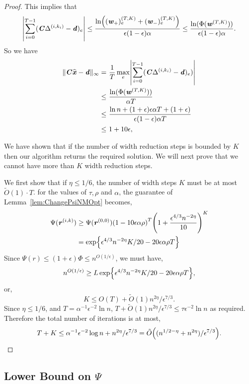 \documentclass[11pt]{article}
\def\abs#1{\left| #1 \right|}
\let\originalleft\left
\let\originalright\right
\renewcommand{\left}{\mathopen{}\mathclose\bgroup\originalleft}
\renewcommand{\right}{\aftergroup\egroup\originalright}
\newcommand\dd{\boldsymbol{\mathit{d}}}
\newcommand\rr{\boldsymbol{\mathit{r}}}
\newcommand\ww{\boldsymbol{\mathit{w}}}
\newcommand\xx{\boldsymbol{\mathit{x}}}
\newcommand\CC{\boldsymbol{\mathit{C}}}
\newcommand\xxhat{\widehat{\xx}}
\newcommand\Otil{\widetilde{O}}
\begin{document}
\begin{proof}
This implies that
\begin{align*}
\abs{\sum_{i=0}^{T-1} (\CC \Delta^{(i,k_i)} - \dd)_e} \leq \frac{\ln\left((\ww_+)^{(T,K)}_e +(\ww_{-})_e^{(T,K)}\right)}{\epsilon(1-\epsilon)\alpha} \leq \frac{\ln(\Phi(\ww^{(T,K)}))}{\epsilon(1-\epsilon)\alpha}.
\end{align*}
So we have
\begin{align*}
\|\CC \xxhat - \dd\|_{\infty} = &~ \frac{1}{T} \max_e \abs{\sum_{i=0}^{T-1} (\CC \Delta^{(i,k_i)} - \dd)_e)} \\
\leq &~ \frac{\ln(\Phi(\ww^{(T,K)}))}{\alpha T} \\
\leq &~ \frac{\ln n + (1+\epsilon)\epsilon \alpha T + (1+\epsilon)}{\epsilon(1-\epsilon)\alpha T} \\
\leq &~ 1 + 10\epsilon,
\end{align*}

We have shown that if the number of width reduction steps is bounded by $K$ then our algorithm returns the required solution. We will next prove that we cannot have more than $K$ width reduction steps.

We first show that if $\eta \leq 1/6$, the number of width steps $K$ must be at most $\tilde{O}(1)\cdot T$. 
for the values of $\tau, \rho$ and $\alpha$, the guarantee of Lemma~\ref{lem:ChangePsiNMOpt} becomes,
\begin{align*}
\Psi(\rr^{(i,k)})& \geq \Psi(\rr^{(0,0)})\left(1 - 10\epsilon\alpha \rho \right)^T\left(1 +  \frac{\epsilon^{4/3}n^{-2\eta}}{10}\right)^K\\
& = \exp \left\{\epsilon^{4/3} n^{-2\eta} K/20 - 20\epsilon\alpha \rho T\right\}
\end{align*}
Since $\Psi(\rr)\leq (1+\epsilon)\Phi \leq n^{O(1/\epsilon)}$, we must have,
\[
n^{O(1/\epsilon)}\geq L \exp\left\{\epsilon^{4/3} n^{-2\eta} K/20 - 20\epsilon\alpha \rho T\right\},
\]
or,
\[
K \leq O(T) + \Otil(1) n^{2\eta}/\epsilon^{7/3}.
\]
Since $\eta\leq 1/6$, and $T = \alpha^{-1}\epsilon^{-2}\ln n$,  $T + \Otil(1) n^{2\eta}/\epsilon^{7/3} \leq \tau\epsilon^{-2}\ln n$ as required. Therefore the total number of iterations is at most,
\[
T + K \leq  \alpha^{-1}\epsilon^{-2}\log n+  n^{2\eta}/\epsilon^{7/3} = \tilde{O}\left((n^{1/2-\eta} + n^{2\eta})/\epsilon^{7/3}\right).
\]
\end{proof}



 




\subsection*{Lower Bound on \texorpdfstring{$\Psi$}{}}
\end{document}
